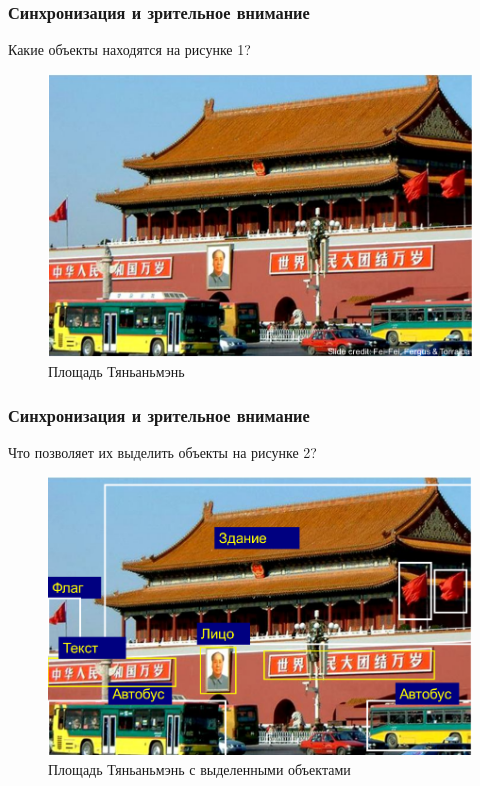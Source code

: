 \documentclass{beamer}
\begin{document}
\begin{frame}
\frametitle{Синхронизация и зрительное внимание}

Какие объекты находятся на рисунке 1?

\begin{figure}
\includegraphics[scale=0.35]{img/tiananmen_square}
\caption{Площадь Тяньаньмэнь}
\end{figure}

\end{frame}


\begin{frame}
\frametitle{Синхронизация и зрительное внимание}

Что позволяет их выделить объекты на рисунке 2?

\begin{figure}
\includegraphics[scale=0.35]{img/tiananmen_square2}
\caption{Площадь Тяньаньмэнь с выделенными объектами}
\end{figure}

\end{frame}
\end{document}
